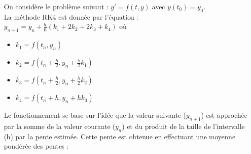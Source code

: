 \documentclass[a4paper, 12pt]{article}
\begin{document}
	On considère le problème suivant : $y' = f(t,y)$ avec $y(t_0) = y_0$. \\
	
La méthode RK4 est donnée par l'équation : $y_{n+1} = y_n + \frac{h}{6} (k_1 + 2k_2 + 2k_3 + k_4)$ où \\
            
	\begin{itemize}
		\item $k_1 = f(t_n, y_n)$ \\
		\item $k_2 = f(t_n + \frac{h}{2}, y_n + \frac{h}{2} k_1)$ \\
		\item $k_3 = f(t_n + \frac{h}{2}, y_n + \frac{h}{2} k_2)$ \\
		\item $k_4 = f(t_n + h, y_n + hk_3)$ \\
	\end{itemize} 
	
	Le fonctionnement se base sur l'idée que la valeur suivante ($y_{n+1}$) est approchée par la somme de la valeur courante ($y_n$) et du produit de la taille de l'intervalle (h) par la pente estimée. Cette pente est obtenue en effectuant une moyenne pondérée des pentes : \\
\end{document}
